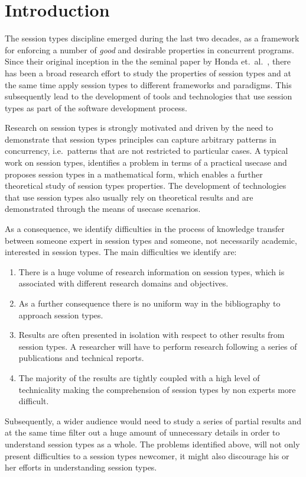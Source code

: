 \section{Introduction}

The session types discipline emerged during the last
two decades, as a framework for enforcing a number
of {\em good} and desirable properties in concurrent
programs.
Since their original inception in the the seminal paper by
Honda et.~al.~\cite{honda.vasconcelos.kubo:language-primitives},
there has been a broad research effort to study the properties of
session types and at the same time apply session types to different
frameworks and paradigms. This subsequently lead to the development
of tools and technologies that use session types as part of the 
software development process.

Research on session types is strongly motivated and driven by
the need to demonstrate that session types principles can
capture arbitrary patterns in concurrency,
i.e.~patterns that are not restricted to particular cases.
A typical work on session types, identifies a problem
in terms of a practical usecase and proposes session types
in a mathematical form, which enables a further
theoretical study of session types properties. The development
of technologies that use session types also usually rely on
theoretical results and are demonstrated through the means
of usecase scenarios.


As a consequence, we identify difficulties in the process
of knowledge transfer between someone expert in session types and
someone, not necessarily academic, interested in session types.
The main difficulties we identify are:
%
\begin{enumerate}%
	\item	There is a huge volume of research information on
			session types, which is associated with different
			research domains and objectives.

	\item	As a further consequence there is no uniform way
			in the bibliography to approach session types.

	\item	Results are often presented in isolation with
			respect to other results from session types.
			A researcher will have to perform research
			following a series of publications and
			technical reports.

	\item	The majority of the results are tightly coupled with
			a high level of technicality making the
			comprehension of session types by non experts
			more difficult.
\end{enumerate}
%
Subsequently, a wider audience would need to study a series
of partial results and at the same time filter out a huge
amount of unnecessary details in order to understand session types
as a whole.
The problems identified above, will not only present
difficulties to a session types newcomer, it might also
discourage his or her efforts in understanding session types.


